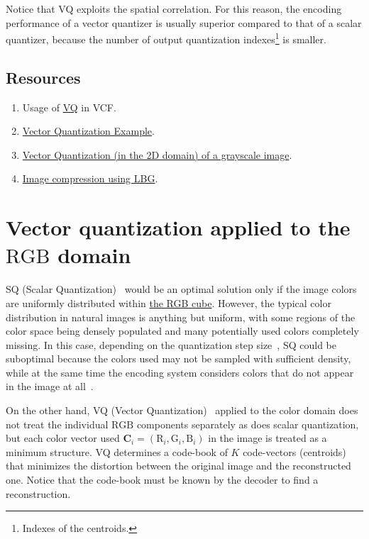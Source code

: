 Notice that VQ exploits the spatial correlation. For this reason, the
encoding performance of a vector quantizer is usually superior
compared to that of a scalar quantizer, because the number of output
quantization indexes\footnote{Indexes of the centroids.} is smaller.

\subsection*{Resources}

\begin{enumerate}
\item Usage of \href{https://github.com/Sistemas-Multimedia/VCF/blob/main/notebooks/VQ.ipynb}{VQ} in VCF.
\item
  \href{https://scikit-learn.org/stable/auto_examples/cluster/plot_face_compress.html#sphx-glr-auto-examples-cluster-plot-face-compress-py}{Vector
    Quantization Example}.
\item
  \href{https://github.com/vicente-gonzalez-ruiz/vector_quantization/blob/main/docs/gray_VQ.ipynb}{Vector
    Quantization (in the 2D domain) of a grayscale image}.
\item \href{https://github.com/droidadroit/LBG}{Image compression using LBG}.
\end{enumerate}


\section{Vector quantization applied to the $\text{RGB}$ domain}

SQ (Scalar
Quantization)~\cite{vruiz__scalar_quantization,sayood2017introduction}
would be an optimal solution only if the image colors are uniformly
distributed within
\href{https://en.wikipedia.org/wiki/RGB_color_model}{the RGB
  cube}. However, the typical color distribution in natural images is
anything but uniform, with some regions of the color space being
densely populated and many potentially used colors completely
missing. In this case, depending on the quantization step
size~\cite{vruiz__signal_quantization}, SQ could be suboptimal because
the colors used may not be sampled with sufficient density, while at the
same time the encoding system considers colors that do not appear
in the image at all~\cite{burger2016digital}.

On the other hand, VQ (Vector
Quantization)~\cite{vruiz__vector_quantization,sayood2017introduction}
applied to the color domain does not treat the individual $\text{RGB}$
components separately as does scalar quantization, but each color
vector used ${\mathbf C}_i = (\text{R}_i, \text{G}_i, \text{B}_i )$ in
the image is treated as a minimum structure. VQ determines a code-book
of $K$ code-vectors (centroids) that minimizes the distortion between
the original image and the reconstructed one. Notice that the
code-book must be known by the decoder to find a reconstruction.

